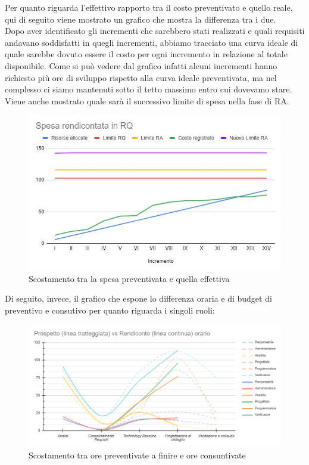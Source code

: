 \documentclass[../piano_di_progetto.tex]{subfiles}
\begin{document}
Per quanto riguarda l'effettivo rapporto tra il costo preventivato e quello reale, qui di seguito viene mostrato un grafico che mostra la differenza tra i due.\\
Dopo aver identificato gli incrementi che sarebbero stati realizzati e quali requisiti andavano soddisfatti in quegli incrementi, abbiamo tracciato una curva ideale di quale sarebbe 
dovuto essere il costo per ogni incremento in relazione al totale disponibile. Come si può vedere dal grafico infatti alcuni incrementi hanno richiesto più ore di sviluppo
rispetto alla curva ideale preventivata, ma nel complesso ci siamo mantenuti sotto il tetto massimo entro cui dovevamo stare. Viene anche mostrato quale sarà il successivo limite di spesa nella fase di RA.


\begin{figure}[H]
	\centering
	\includegraphics[width=17cm]{src/img/report/spesa_RQ.JPG}
	\caption{Scostamento tra la spesa preventivata e quella effettiva}
\end{figure}


Di seguito, invece, il grafico che espone lo differenza oraria e di budget di preventivo e consutivo per quanto riguarda i singoli ruoli:


\begin{figure}[H]
	\centering
	\includegraphics[width=17cm]{src/img/report/prospetto_ore_totale}
	\caption{Scostamento tra ore preventivate a finire e ore consuntivate}
\end{figure}
\end{document}
